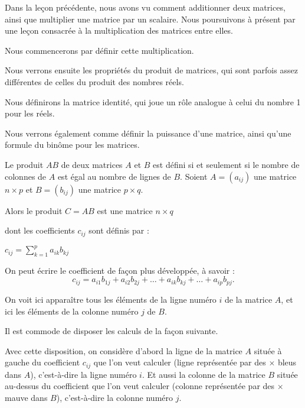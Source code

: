 







\debuttexte


\diapo

\change
Dans la leçon précédente, nous avons vu comment additionner deux matrices, 
ainsi que multiplier une matrice par un scalaire. Nous poursuivons à présent 
par une leçon consacrée à la multiplication des matrices entre elles.

\change
Nous commencerons par définir cette multiplication.
% 

\change
Nous verrons ensuite les propriétés du produit de matrices, qui sont parfois assez 
différentes de celles du produit des nombres réels.

\change
Nous définirons la matrice identité, qui joue un rôle analogue à celui du nombre 1 pour les réels.

\change
Nous verrons également comme définir la puissance d'une matrice, ainsi qu'une formule du binôme pour les matrices.


\diapo

Le produit $AB$ de deux matrices $A$ et $B$ est défini si et seulement si le nombre de colonnes de 
$A$ est égal au nombre de lignes de $B$. Soient $A=(a_{ij})$ une matrice $n\times p$ et $B=(b_{ij})$ une matrice $p\times q$. 

\change
Alors le produit $C=AB$ est une matrice $n\times q$

\change
 dont les coefficients $c_{ij}$ sont définis par :

$
c_{ij} = \sum_{k=1}^p a_{ik}b_{kj}
$

\change
On peut écrire le coefficient de façon plus développée, à savoir : 
$$c_{ij}=a_{i1}b_{1j}+a_{i2}b_{2j}+ \dots + 
a_{ik}b_{kj}+ \dots + a_{ip}b_{pj}.$$ 

On voit ici apparaître tous les éléments de la ligne numéro $i$ de la matrice $A$, et ici les éléments de la colonne numéro $j$ de $B$.

\change
Il est commode de disposer les calculs de la façon suivante.

Avec cette disposition, on considère d'abord la ligne de la matrice $A$ située à gauche du coefficient $c_{ij}$ que l'on veut calculer (ligne représentée par des $\times $ bleus dans $A$), c'est-à-dire la ligne numéro $i$. Et aussi la colonne de la matrice $B$ située au-dessus du coefficient que l'on veut calculer (colonne représentée par des $\times$ mauve dans $B$), c'est-à-dire la colonne numéro $j$.

